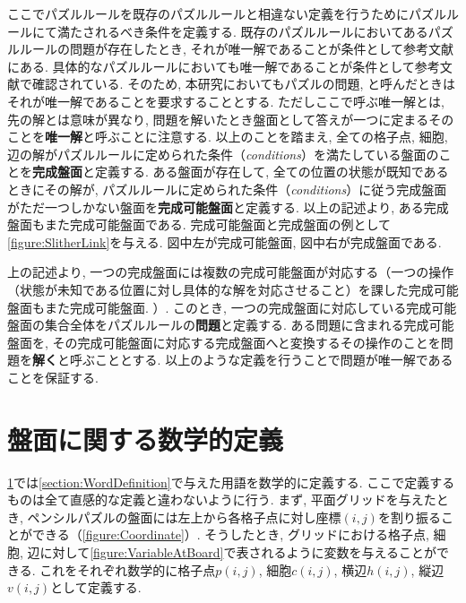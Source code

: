ここでパズルルールを既存のパズルルールと相違ない定義を行うためにパズルルールにて満たされるべき条件を定義する. 既存のパズルルールにおいてあるパズルルールの問題が存在したとき, それが唯一解であることが条件として参考文献にある. 具体的なパズルルールにおいても唯一解であることが条件として参考文献で確認されている. そのため, 本研究においてもパズルの問題, と呼んだときはそれが唯一解であることを要求することとする. ただしここで呼ぶ唯一解とは, 先の解とは意味が異なり, 問題を解いたとき盤面として答えが一つに定まるそのことを\textbf{唯一解}と呼ぶことに注意する.
以上のことを踏まえ, 全ての格子点, 細胞, 辺の解がパズルルールに定められた条件（\textit{conditions}）を満たしている盤面のことを\textbf{完成盤面}と定義する. ある盤面が存在して, 全ての位置の状態が既知であるときにその解が, パズルルールに定められた条件（\textit{conditions}）に従う完成盤面がただ一つしかない盤面を\textbf{完成可能盤面}と定義する. 以上の記述より, ある完成盤面もまた完成可能盤面である. 完成可能盤面と完成盤面の例として\cref{figure:SlitherLink}を与える. 図中左が完成可能盤面, 図中右が完成盤面である.

上の記述より, 一つの完成盤面には複数の完成可能盤面が対応する（一つの操作（状態が未知である位置に対し具体的な解を対応させること）を課した完成可能盤面もまた完成可能盤面. ）. このとき, 一つの完成盤面に対応している完成可能盤面の集合全体をパズルルールの\textbf{問題}と定義する. ある問題に含まれる完成可能盤面を, その完成可能盤面に対応する完成盤面へと変換するその操作のことを問題を\textbf{解く}と呼ぶこととする.
以上のような定義を行うことで問題が唯一解であることを保証する.

\section{盤面に関する数学的定義}\label{section:MathematicalDefinition}
\cref{section:MathematicalDefinition}では\cref{section:WordDefinition}で与えた用語を数学的に定義する. ここで定義するものは全て直感的な定義と違わないように行う.
まず, 平面グリッドを与えたとき, ペンシルパズルの盤面には左上から各格子点に対し座標$(i,j)$を割り振ることができる（\cref{figure:Coordinate}）. そうしたとき, グリッドにおける格子点, 細胞, 辺に対して\cref{figure:VariableAtBoard}で表されるように変数を与えることができる.
これをそれぞれ数学的に格子点$p(i,j)$, 細胞$c(i,j)$, 横辺$h(i,j)$, 縦辺$v(i,j)$として定義する.

